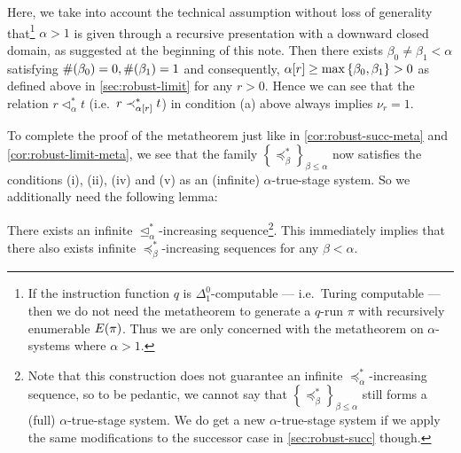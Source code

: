 \documentclass[11pt]{article}
\theoremstyle{plain}
\theoremstyle{definition}
\begin{document}
Here, we take into account the technical assumption without loss of generality that\footnote{If the instruction function $q$ is $\Delta^0_1$-computable --- i.e.\ Turing computable --- then we do not need the metatheorem to generate a $q$-run $\pi$ with recursively enumerable $E\mleft(\pi\mright)$. Thus we are only concerned with the metatheorem on $\alpha$-systems where $\alpha > 1$.} $\alpha > 1$ is given through a recursive presentation with a downward closed domain, as suggested at the beginning of this note. Then there exists $\beta_0 \neq \beta_1 < \alpha$ satisfying $\#\mleft(\beta_0\mright) = 0, \#\mleft(\beta_1\mright) = 1$ and consequently, $\alpha\mleft[r\mright] \geq \max \left\{\beta_0, \beta_1\right\} > 0$ as defined above in \autoref{sec:robust-limit} for any $r > 0$. Hence we can see that the relation $r \lhd_\alpha^* t$ (i.e.\ $r \prec_{\alpha\mleft[r\mright]}^* t$) in condition (a) above always implies $\nu_r = 1$.

To complete the proof of the metatheorem just like in \autoref{cor:robust-succ-meta} and \autoref{cor:robust-limit-meta}, we see that the family $\left\{\preceq_\beta^*\right\}_{\beta \leq \alpha}$ now satisfies the conditions (i), (ii), (iv) and (v) as an (infinite) $\alpha$-true-stage system. So we additionally need the following lemma:

\begin{lemma}
  There exists an infinite $\unlhd_\alpha^*$-increasing sequence\footnote{Note that this construction does not guarantee an infinite $\preceq_\alpha^*$-increasing sequence, so to be pedantic, we cannot say that $\left\{\preceq_\beta^*\right\}_{\beta \leq \alpha}$ still forms a (full) $\alpha$-true-stage system. We do get a new $\alpha$-true-stage system if we apply the same modifications to the successor case in \autoref{sec:robust-succ} though.}. This immediately implies that there also exists infinite $\preceq_\beta^*$-increasing sequences for any $\beta < \alpha$.
\end{lemma}
\end{document}
